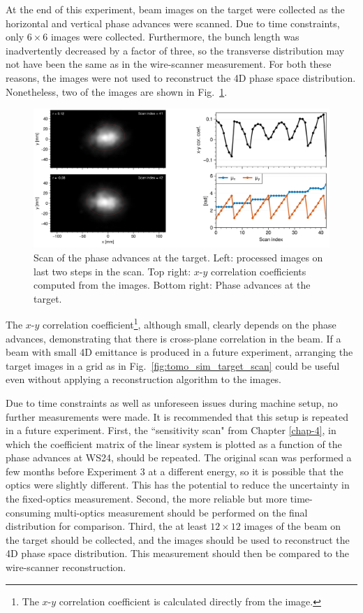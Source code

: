 At the end of this experiment, beam images on the target were collected as the horizontal and vertical phase advances were scanned. Due to time constraints, only $6 \times 6$ images were collected. Furthermore, the bunch length was inadvertently decreased by a factor of three, so the transverse distribution may not have been the same as in the wire-scanner measurement. For both these reasons, the images were not used to reconstruct the 4D phase space distribution. Nonetheless, two of the images are shown in Fig.~\ref{fig:exp3_target_scan}. 
%
\begin{figure}[!p]
    \centering
    \includegraphics[width=\textwidth]{Images/chapter5/exp3/target_scan/target_scan.png}
    \caption{Scan of the phase advances at the target. Left: processed images on last two steps in the scan. Top right: $x$-$y$ correlation coefficients computed from the images. Bottom right: Phase advances at the target.}
    \label{fig:exp3_target_scan}
\end{figure}
%
The $x$-$y$ correlation coefficient\footnote{The $x$-$y$ correlation coefficient is calculated directly from the image.}, although small, clearly depends on the phase advances, demonstrating that there is cross-plane correlation in the beam. If a beam with small 4D emittance is produced in a future experiment, arranging the target images in a grid as in Fig.~\ref{fig:tomo_sim_target_scan} could be useful even without applying a reconstruction algorithm to the images. 

Due to time constraints as well as unforeseen issues during machine setup, no further measurements were made. It is recommended that this setup is repeated in a future experiment. First, the ``sensitivity scan" from Chapter \ref{chap-4}, in which the coefficient matrix of the linear system is plotted as a function of the phase advances at WS24, should be repeated. The original scan was performed a few months before Experiment 3 at a different energy, so it is possible that the optics were slightly different. This has the potential to reduce the uncertainty in the fixed-optics measurement. Second, the more reliable but more time-consuming multi-optics measurement should be performed on the final distribution for comparison. Third, the at least $12 \times 12$ images of the beam on the target should be collected, and the images should be used to reconstruct the 4D phase space distribution. This measurement should then be compared to the wire-scanner reconstruction.

